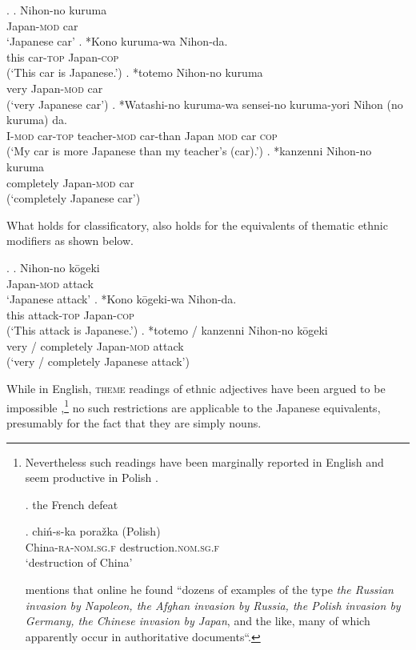 \documentclass [output=book,colorlinks,citecolor=brown]{langscibook}
\begin{document}

\ex. \ag. Nihon-no kuruma\\
Japan-\textsc{mod} car\\
`Japanese car'
\bg. *Kono kuruma-wa Nihon-da.\\
this car-\textsc{top} Japan-\textsc{cop}\\
(`This car is Japanese.’) \label{kurumanihonda}
\cg. *totemo Nihon-no kuruma\\
very Japan-\textsc{mod} car\\
(`very Japanese car’) \label{totemonihon}
\dg. *Watashi-no kuruma-wa sensei-no kuruma-yori Nihon (no kuruma) da.\\
I-\textsc{mod} car-\textsc{top} teacher-\textsc{mod} car-than Japan \textsc{mod} car \textsc{cop}\\
(`My car is more Japanese than my teacher's (car).’) \label{yorinihon}
\eg. *kanzenni Nihon-no kuruma\\
completely Japan-\textsc{mod} car\\
(`completely Japanese car’) \label{kanzenni}

What holds for classificatory, also holds for the equivalents of thematic ethnic modifiers as shown below.

\newpage

\ex. \ag. Nihon-no kōgeki\\
Japan-\textsc{mod} attack\\
`Japanese attack'
\bg. *Kono kōgeki-wa Nihon-da.\\
this attack-\textsc{top} Japan-\textsc{cop}\\
(`This attack is Japanese.’)
\cg. *totemo / kanzenni Nihon-no kōgeki\\
very / completely Japan-\textsc{mod} attack\\
(`very / completely Japanese attack’)

While in English, \textsc{theme} readings of ethnic adjectives have been argued to be impossible \citep{kayne:1981:ecp, giorgi:1991:syntax},\footnote{Nevertheless such readings have been marginally reported in English \citep{arseni:2014:EA} and seem productive in Polish \citep{cetnarowska:2015:categorial}.

\par

\ex. the French defeat \null\hfill \citep[23]{arseni:2014:EA}

\exg. chiń-s-ka pora\v{z}ka (Polish)\\
China-\textsc{ra-nom.sg.f} destruction.\textsc{nom.sg.f}\\
`destruction of China' \null\hfill \citep[136]{cetnarowska:2015:categorial}

\par


\citet[20]{rainer:2013:can} mentions that online he found ``dozens of examples of the type \textit{the Russian invasion by Napoleon, the Afghan invasion by Russia, the Polish invasion by Germany, the Chinese invasion by Japan}, and the like, many of which apparently occur in authoritative documents“.} no such restrictions are applicable to the Japanese equivalents, presumably for the fact that they are simply nouns. %
\end{document}
